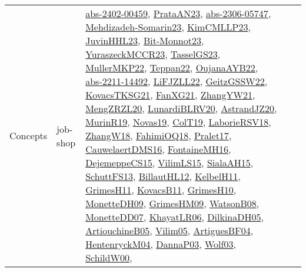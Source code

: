 {\begin{longtable}{lp{3cm}>{\raggedright}p{6cm}>{\raggedright}p{6cm}p{8cm}}
Concepts & job-shop & \href{articles/abs-2402-00459.pdf}{abs-2402-00459}\cite{abs-2402-00459}, \href{articles/PrataAN23.pdf}{PrataAN23}\cite{PrataAN23}, \href{articles/abs-2306-05747.pdf}{abs-2306-05747}\cite{abs-2306-05747}, \href{papers/Mehdizadeh-Somarin23.pdf}{Mehdizadeh-Somarin23}\cite{Mehdizadeh-Somarin23}, \href{papers/KimCMLLP23.pdf}{KimCMLLP23}\cite{KimCMLLP23}, \href{papers/JuvinHHL23.pdf}{JuvinHHL23}\cite{JuvinHHL23}, \href{papers/Bit-Monnot23.pdf}{Bit-Monnot23}\cite{Bit-Monnot23}, \href{articles/YuraszeckMCCR23.pdf}{YuraszeckMCCR23}\cite{YuraszeckMCCR23}, \href{papers/TasselGS23.pdf}{TasselGS23}\cite{TasselGS23}, \href{articles/MullerMKP22.pdf}{MullerMKP22}\cite{MullerMKP22}, \href{papers/Teppan22.pdf}{Teppan22}\cite{Teppan22}, \href{papers/OujanaAYB22.pdf}{OujanaAYB22}\cite{OujanaAYB22}, \href{articles/abs-2211-14492.pdf}{abs-2211-14492}\cite{abs-2211-14492}, \href{papers/LiFJZLL22.pdf}{LiFJZLL22}\cite{LiFJZLL22}, \href{papers/GeitzGSSW22.pdf}{GeitzGSSW22}\cite{GeitzGSSW22}, \href{papers/KovacsTKSG21.pdf}{KovacsTKSG21}\cite{KovacsTKSG21}, \href{articles/FanXG21.pdf}{FanXG21}\cite{FanXG21}, \href{articles/ZhangYW21.pdf}{ZhangYW21}\cite{ZhangYW21}, \href{articles/MengZRZL20.pdf}{MengZRZL20}\cite{MengZRZL20}, \href{articles/LunardiBLRV20.pdf}{LunardiBLRV20}\cite{LunardiBLRV20}, \href{articles/AstrandJZ20.pdf}{AstrandJZ20}\cite{AstrandJZ20}, \href{papers/MurinR19.pdf}{MurinR19}\cite{MurinR19}, \href{articles/Novas19.pdf}{Novas19}\cite{Novas19}, \href{papers/ColT19.pdf}{ColT19}\cite{ColT19}, \href{articles/LaborieRSV18.pdf}{LaborieRSV18}\cite{LaborieRSV18}, \href{articles/ZhangW18.pdf}{ZhangW18}\cite{ZhangW18}, \href{articles/FahimiOQ18.pdf}{FahimiOQ18}\cite{FahimiOQ18}, \href{papers/Pralet17.pdf}{Pralet17}\cite{Pralet17}, \href{papers/CauwelaertDMS16.pdf}{CauwelaertDMS16}\cite{CauwelaertDMS16}, \href{papers/FontaineMH16.pdf}{FontaineMH16}\cite{FontaineMH16}, \href{papers/DejemeppeCS15.pdf}{DejemeppeCS15}\cite{DejemeppeCS15}, \href{papers/VilimLS15.pdf}{VilimLS15}\cite{VilimLS15}, \href{papers/SialaAH15.pdf}{SialaAH15}\cite{SialaAH15}, \href{papers/SchuttFS13.pdf}{SchuttFS13}\cite{SchuttFS13}, \href{papers/BillautHL12.pdf}{BillautHL12}\cite{BillautHL12}, \href{articles/KelbelH11.pdf}{KelbelH11}\cite{KelbelH11}, \href{papers/GrimesH11.pdf}{GrimesH11}\cite{GrimesH11}, \href{articles/KovacsB11.pdf}{KovacsB11}\cite{KovacsB11}, \href{papers/GrimesH10.pdf}{GrimesH10}\cite{GrimesH10}, \href{papers/MonetteDH09.pdf}{MonetteDH09}\cite{MonetteDH09}, \href{papers/GrimesHM09.pdf}{GrimesHM09}\cite{GrimesHM09}, \href{papers/WatsonB08.pdf}{WatsonB08}\cite{WatsonB08}, \href{papers/MonetteDD07.pdf}{MonetteDD07}\cite{MonetteDD07}, \href{articles/KhayatLR06.pdf}{KhayatLR06}\cite{KhayatLR06}, \href{papers/DilkinaDH05.pdf}{DilkinaDH05}\cite{DilkinaDH05}, \href{papers/ArtiouchineB05.pdf}{ArtiouchineB05}\cite{ArtiouchineB05}, \href{papers/Vilim05.pdf}{Vilim05}\cite{Vilim05}, \href{papers/ArtiguesBF04.pdf}{ArtiguesBF04}\cite{ArtiguesBF04}, \href{papers/HentenryckM04.pdf}{HentenryckM04}\cite{HentenryckM04}, \href{papers/DannaP03.pdf}{DannaP03}\cite{DannaP03}, \href{papers/Wolf03.pdf}{Wolf03}\cite{Wolf03}, \href{articles/SchildW00.pdf}{SchildW00}\cite{SchildW00}, 
\end{longtable}}
